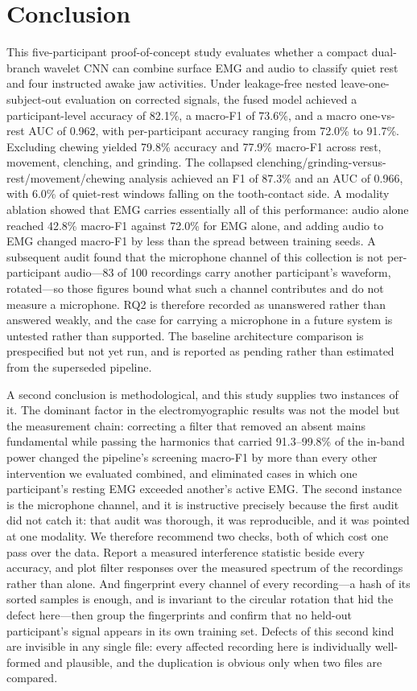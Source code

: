 \documentclass[pdflatex,sn-nature,iicol]{sn-jnl}
\begin{document}
\section{Conclusion}

This five-participant proof-of-concept study evaluates whether a compact dual-branch wavelet CNN can combine surface EMG and audio to classify quiet rest and four instructed awake jaw activities. Under leakage-free nested leave-one-subject-out evaluation on corrected signals, the fused model achieved a participant-level accuracy of 82.1\%, a macro-F1 of 73.6\%, and a macro one-vs-rest AUC of 0.962, with per-participant accuracy ranging from 72.0\% to 91.7\%. Excluding chewing yielded 79.8\% accuracy and 77.9\% macro-F1 across rest, movement, clenching, and grinding. The collapsed clenching/grinding-versus-rest/movement/chewing analysis achieved an F1 of 87.3\% and an AUC of 0.966, with 6.0\% of quiet-rest windows falling on the tooth-contact side. A modality ablation showed that EMG carries essentially all of this performance: audio alone reached 42.8\% macro-F1 against 72.0\% for EMG alone, and adding audio to EMG changed macro-F1 by less than the spread between training seeds. A subsequent audit found that the microphone channel of this collection is not per-participant audio---83 of 100 recordings carry another participant's waveform, rotated---so those figures bound what such a channel contributes and do not measure a microphone. RQ2 is therefore recorded as unanswered rather than answered weakly, and the case for carrying a microphone in a future system is untested rather than supported. The baseline architecture comparison is prespecified but not yet run, and is reported as pending rather than estimated from the superseded pipeline.

A second conclusion is methodological, and this study supplies two instances of it. The dominant factor in the electromyographic results was not the model but the measurement chain: correcting a filter that removed an absent mains fundamental while passing the harmonics that carried 91.3--99.8\% of the in-band power changed the pipeline's screening macro-F1 by more than every other intervention we evaluated combined, and eliminated cases in which one participant's resting EMG exceeded another's active EMG. The second instance is the microphone channel, and it is instructive precisely because the first audit did not catch it: that audit was thorough, it was reproducible, and it was pointed at one modality. We therefore recommend two checks, both of which cost one pass over the data. Report a measured interference statistic beside every accuracy, and plot filter responses over the measured spectrum of the recordings rather than alone. And fingerprint every channel of every recording---a hash of its sorted samples is enough, and is invariant to the circular rotation that hid the defect here---then group the fingerprints and confirm that no held-out participant's signal appears in its own training set. Defects of this second kind are invisible in any single file: every affected recording here is individually well-formed and plausible, and the duplication is obvious only when two files are compared.
\end{document}
